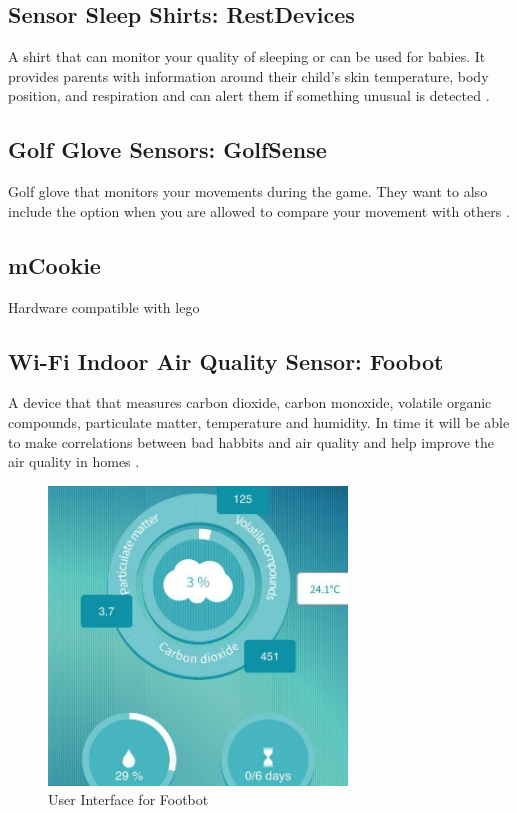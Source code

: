 \documentclass[12pt]{article}
\begin{document}
\subsection {Sensor Sleep Shirts: RestDevices} A shirt that can monitor your quality of sleeping or can be used for babies. It provides parents with information around their child's skin temperature, body position, and respiration and can alert them if something unusual is detected \cite {shirt}.
\subsection {Golf Glove Sensors: GolfSense}  Golf glove that monitors your movements during the game. They want to also include the option when you are allowed to compare your movement with others \cite {golf}.

\subsection {mCookie} Hardware compatible with lego \cite {lego}
\subsection {Wi-Fi Indoor Air Quality Sensor: Foobot}

A device that that measures carbon dioxide, carbon monoxide, volatile organic compounds, particulate matter, temperature and humidity. In time it will be able to make correlations between bad habbits and air quality and help improve the air quality in homes \cite {air}.
\begin{figure}
\caption{User Interface for Footbot}
\includegraphics{air}

\end{figure}
\end{document}
